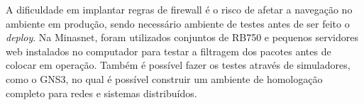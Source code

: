    A dificuldade em implantar regras de firewall é o risco de afetar a navegação no ambiente em produção, sendo necessário ambiente de testes antes de ser feito o \textit{deploy}. Na Minasnet, foram utilizados conjuntos de RB750 e pequenos servidores web instalados no computador para testar a filtragem dos pacotes antes de colocar em operação. Também é possível fazer os testes através de simuladores, como o GNS3, no qual é possível construir um ambiente de homologação completo para redes e sistemas distribuídos.
    
